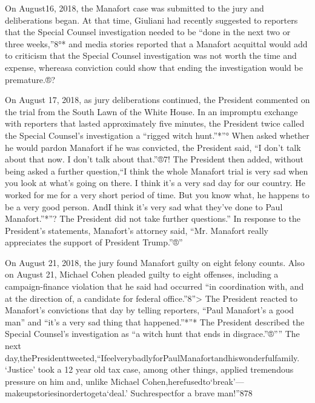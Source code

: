 On August16, 2018, the Manafort case was submitted to the jury and deliberations began. At that time, Giuliani had recently suggested to reporters that the Special Counsel investigation needed to be “done in the next two or three weeks,”8°* and media stories reported that a Manafort acquittal would add to criticism that the Special Counsel investigation was not worth the time and expense, whereasa conviction could show that ending the investigation would be premature.®?

On August 17, 2018, as jury deliberations continued, the President commented on the trial from the South Lawn of the White House. In an impromptu exchange with reporters that lasted approximately five minutes, the President twice called the Special Counsel's investigation a “rigged witch hunt.”*”° When asked whether he would pardon Manafort if he was convicted, the President said, “I don't talk about that now. I don't talk about that.”®7! The President then added, without being asked a further question,“I think the whole Manafort trial is very sad when you look at what's going on there. I think it's a very sad day for our country. He worked for me for a very short period of time. But you know what, he happens to be a very good person. AndI think it's very sad what they've done to Paul Manafort.”*”? The President did not take further questions.” In response to the President's statements, Manafort's attorney said, “Mr. Manafort really appreciates the support of President Trump.”®”

On August 21, 2018, the jury found Manafort guilty on eight felony counts. Also on August 21, Michael Cohen pleaded guilty to eight offenses, including a campaign-finance violation that he said had occurred “in coordination with, and at the direction of, a candidate for federal office.”8”> The President reacted to Manafort's convictions that day by telling reporters, “Paul Manafort's a good man” and “it's a very sad thing that happened.”*”* The President described the Special Counsel's investigation as “a witch hunt that ends in disgrace.”®”” The next day,thePresidenttweeted,“IfeelverybadlyforPaulManafortandhiswonderfulfamily. ‘Justice' took a 12 year old tax case, among other things, applied tremendous pressure on him and, unlike Michael Cohen,herefusedto‘break'—makeupstoriesinordertogeta‘deal.' Suchrespectfor a brave man!”878

